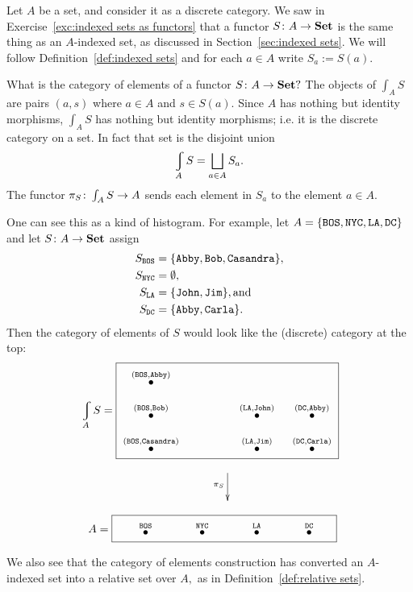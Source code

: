 \documentclass[CT4S-EN-RU]{subfiles}
\begin{document}
\begin{exampleENG}
Let $A$ be a set, and consider it as a discrete category. We saw in Exercise~\ref{exc:indexed sets as functors} that a functor $S\colon A\rightarrow{\mathbf{Set}}$ is the same thing as an $A$-indexed set, as discussed in Section~\ref{sec:indexed sets}. We will follow Definition~\ref{def:indexed sets} and for each $a\in A$ write $S_a:=S(a).$

What is the category of elements of a functor $S\colon A\rightarrow{\mathbf{Set}}?$ The objects of $\int_AS$ are pairs $(a,s)$ where $a\in A$ and $s\in S(a).$ Since $A$ has nothing but identity morphisms, $\int_AS$ has nothing but identity morphisms; i.e. it is the discrete category on a set. In fact that set is the disjoint union $$\varint_AS=\bigsqcup_{a\in A}S_a.$$ The functor $\pi_S\colon\int_AS\rightarrow A$ sends each element in $S_a$ to the element $a\in A.$ 

One can see this as a kind of histogram. For example, let $A=\{{\tt BOS, NYC, LA, DC}\}$ and let $S\colon A\rightarrow{\mathbf{Set}}$ assign 
\begin{align*}
S_{{\tt BOS}}&=\{{\tt Abby, Bob, Casandra}\},\\
S_{\tt NYC}&=\emptyset,\\
S_{\tt LA}&=\{{\tt John, Jim}\}, \textnormal{and}\\
S_{\tt DC}&=\{{\tt Abby,Carla}\}.
\end{align*}
Then the category of elements of $S$ would look like the (discrete) category at the top: 
\begin{align}\label{dia:elements for cities}
\varint_AS=\parbox{2.7in}{\fbox{\xymatrix@=10pt{
\LTO{(BOS,Abby)}\\
\LTO{(BOS,Bob)}&\hspace{.3in}&\LTO{(LA,John)}&\LTO{(DC,Abby)}\\
\LTO{(BOS,Casandra)}&&\LTO{(LA,Jim)}&\LTO{(DC,Carla)}
}}}
\end{align}
$$
\hsp\xymatrix{~\ar[d]_{\pi_S}\\~}
$$
$$
\;\;A=\fbox{\xymatrix@=33pt{\hspace{.25in}\LTO{BOS}&\LTO{NYC}&\LTO{LA}&\LTO{DC}\hspace{.2in}}}
$$

We also see that the category of elements construction has converted an $A$-indexed set into a relative set over $A,$ as in Definition~\ref{def:relative sets}.
\end{exampleENG}

\begin{exampleRUS}
\end{exampleRUS}
\end{document}
